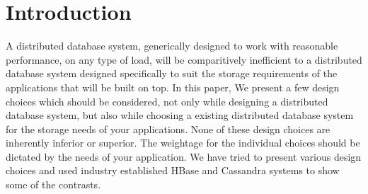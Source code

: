 \section{Introduction}

A distributed database system, generically designed to work with reasonable performance, on any type of load, will be comparitively inefficient to a distributed database system designed specifically to suit the storage requirements of the applications that will be built on top. In this paper, We present a few design choices which should be considered, not only while designing a distributed database system, but also while choosing a existing distributed database system for the storage needs of your applications. None of these design choices are inherently inferior or superior. The weightage for the individual choices should be dictated by the needs of your application. We have tried to present various design choices and used industry established HBase and Cassandra systems to show some of the contrasts.